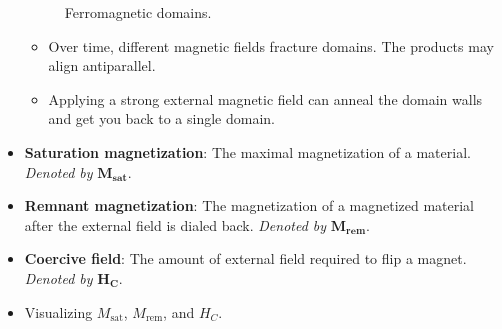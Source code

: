 \documentclass[../notes.tex]{subfiles}
\begin{document}
\begin{itemize}
\begin{figure}[h!]
        \caption{Ferromagnetic domains.}
        \label{fig:FMdomains}
    \end{figure}
    \begin{itemize}
        \item Over time, different magnetic fields fracture domains. The products may align antiparallel.
        \item Applying a strong external magnetic field can anneal the domain walls and get you back to a single domain.
    \end{itemize}
    \item \textbf{Saturation magnetization}: The maximal magnetization of a material. \emph{Denoted by} $\bm{M_\textbf{sat}}$.
    \item \textbf{Remnant magnetization}: The magnetization of a magnetized material after the external field is dialed back. \emph{Denoted by} $\bm{M_\textbf{rem}}$.
    \item \textbf{Coercive field}: The amount of external field required to flip a magnet. \emph{Denoted by} $\bm{H_C}$.
    \item Visualizing $M_\text{sat}$, $M_\text{rem}$, and $H_C$.
    \begin{figure}[H]
        \centering
\end{figure}
\end{itemize}
\end{document}

